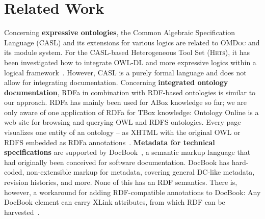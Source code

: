 \documentclass{llncs}
\renewcommand{\omdoc}{\textsc{OMDoc}\xspace}
\begin{document}
% 

\section{Related Work}
\label{sec:related}

Concerning \textbf{expressive ontologies}, the Common Algebraic Specification Language
(CASL) and its extensions for various logics are related to \omdoc and its module system.
For the CASL-based Heterogeneous Tool Set (\textsc{Hets}), it has been investigated how to
integrate OWL-DL and more expressive logics within a logical
framework~\cite{KutzEtAl:OWL-CASL08}.  However, CASL is a purely formal language and does
not allow for integrating documentation.  Concerning \textbf{integrated ontology
  documentation}, RDFa in combination with RDF-based ontologies is similar to our
approach.  RDFa has mainly been used for ABox knowledge so far; we are only aware of one
application of RDFa for TBox knowledge: Ontology Online is a web site for browsing and
querying OWL and RDFS ontologies.  Every page visualizes one entity of an ontology -- as
XHTML with the original OWL or RDFS embedded as RDFa
annotations~\cite{Decraene:OWL-RDFa07}.  \textbf{Metadata for technical specifications}
are supported by DocBook~\cite{WalMue:dtdg2008}, a semantic markup language that had
originally been conceived for software documentation.  DocBook has hard-coded,
non-extensible markup for metadata, covering general DC-like metadata, revision histories,
and more.  None of this has an RDF semantics.  There is, however, a workaround for adding
RDF-compatible annotations to DocBook: Any DocBook element can carry XLink attributes,
from which RDF can be harvested~\cite{W3C:HarvestRDFfromXLink}.

\ifpublic
\else
{}

\fi
\end{document}
